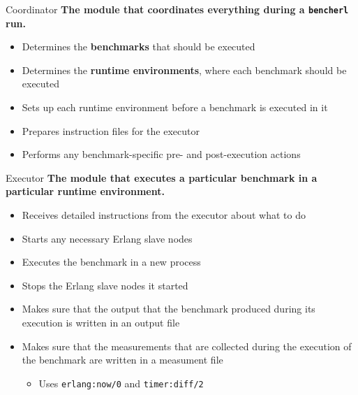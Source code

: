 \documentclass{beamer}
\begin{document}
\begin{frame}[t]{Coordinator}
	{\bf The module that coordinates everything during a \texttt{bencherl} run.}
	\begin{itemize}
		\item Determines the {\bf benchmarks} that should be executed
		\item Determines the {\bf runtime environments}, where each benchmark should be executed
		\item Sets up each runtime environment before a benchmark is executed in it
		\item Prepares instruction files for the \textcolor{burgundy}{executor}
		\item Performs any benchmark-specific pre- and post-execution actions
	\end{itemize}
\end{frame}

\begin{frame}[t]{Executor}
	{\bf The module that executes a particular benchmark in a particular runtime environment.}
	\begin{itemize}
		\item Receives detailed instructions from the \textcolor{burgundy}{executor} about what to do 
		\item Starts any necessary Erlang slave nodes
		\item Executes the benchmark in a new process
		\item Stops the Erlang slave nodes it started
		\item Makes sure that the output that the benchmark produced during its execution is written in an output file
		\item Makes sure that the measurements that are collected during the execution of the benchmark are written in a measument file 
			\begin{itemize}
				\item Uses \texttt{erlang:now/0} and \texttt{timer:diff/2}
			\end{itemize}
	\end{itemize}
\end{frame}
\end{document}

